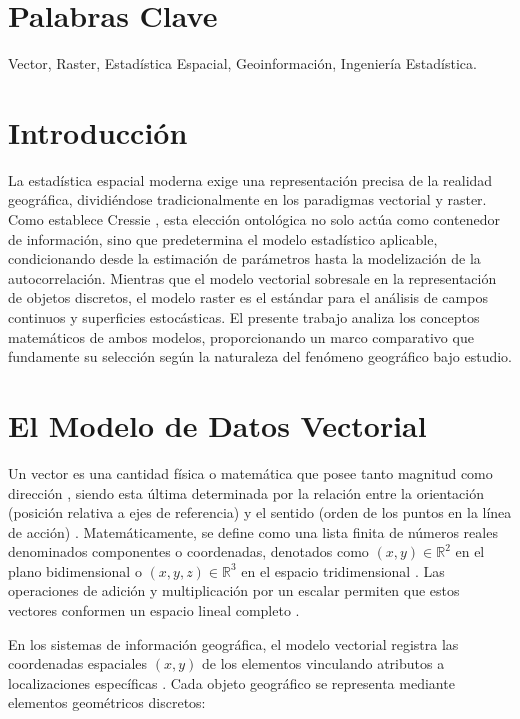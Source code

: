 \documentclass[11pt,a4paper]{article}
\begin{document}
\section*{Palabras Clave}
Vector, Raster, Estadística Espacial, Geoinformación, Ingeniería Estadística.

\newpage
\tableofcontents
\newpage

\section{Introducción}
La estadística espacial moderna exige una representación precisa de la realidad geográfica, dividiéndose tradicionalmente en los paradigmas vectorial y raster. Como establece Cressie \cite{cressie1993statistics}, esta elección ontológica no solo actúa como contenedor de información, sino que predetermina el modelo estadístico aplicable, condicionando desde la estimación de parámetros hasta la modelización de la autocorrelación. Mientras que el modelo vectorial sobresale en la representación de objetos discretos, el modelo raster es el estándar para el análisis de campos continuos y superficies estocásticas. El presente trabajo analiza los conceptos matemáticos de ambos modelos, proporcionando un marco comparativo que fundamente su selección según la naturaleza del fenómeno geográfico bajo estudio.

\section{El Modelo de Datos Vectorial}

Un vector es una cantidad física o matemática que posee tanto magnitud como dirección \cite{simons1970vector}, siendo esta última determinada por la relación entre la orientación (posición relativa a ejes de referencia) y el sentido (orden de los puntos en la línea de acción) \cite{marghitu2005introduction}. Matemáticamente, se define como una lista finita de números reales denominados componentes o coordenadas, denotados como $(x, y) \in \mathbb{R}^2$ en el plano bidimensional o $(x, y, z) \in \mathbb{R}^3$ en el espacio tridimensional \cite{shapira2019vectors}. Las operaciones de adición y multiplicación por un escalar permiten que estos vectores conformen un espacio lineal completo \cite{shapira2019vectors}.

En los sistemas de información geográfica, el modelo vectorial registra las coordenadas espaciales $(x, y)$ de los elementos vinculando atributos a localizaciones específicas \cite{osullivan2010geographic}. Cada objeto geográfico se representa mediante elementos geométricos discretos:
\end{document}
